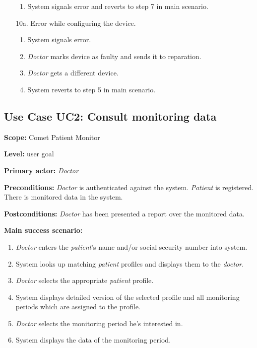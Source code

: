 \documentclass[fontsize=12pt,
               paper=a4,
               twoside=false,
               parskip=half,
               ]{scrartcl}
\begin{document}
\begin{itemize}[leftmargin=3em]
\begin{enumerate}
		\item System signals error and reverts to step 7 in main scenario.
	\end{enumerate}
	\item[10a.] Error while configuring the device.
	\begin{enumerate}
		\item System signals error.
		\item \emph{Doctor} marks device as faulty and sends it to reparation.
		\item \emph{Doctor} gets a different device.
		\item System reverts to step 5 in main scenario.
	\end{enumerate}
\end{itemize}


\subsection{Use Case UC2: Consult monitoring data}

\textbf{\textsf{Scope:}} Comet Patient Monitor

\textbf{\textsf{Level:}} user goal

\textbf{\textsf{Primary actor:}} \emph{Doctor}

\textbf{\textsf{Preconditions:}} \emph{Doctor} is authenticated against the system. \emph{Patient} is registered. There is monitored data in the system.

\textbf{\textsf{Postconditions:}} \emph{Doctor} has been presented a report over the monitored data.

\textbf{\textsf{Main success scenario:}}

\begin{enumerate}[leftmargin=3em]
	\item \emph{Doctor} enters the \emph{patient}'s name and/or social security number into system.
	\item System looks up matching \emph{patient} profiles and displays them to the \emph{doctor}.
	\item \emph{Doctor} selects the appropriate \emph{patient} profile.
	\item System displays detailed version of the selected profile and all monitoring periods which are assigned to the profile.
	\item \emph{Doctor} selects the monitoring period he's interested in.
	\item System displays the data of the monitoring period.
\end{enumerate}
\end{document}

